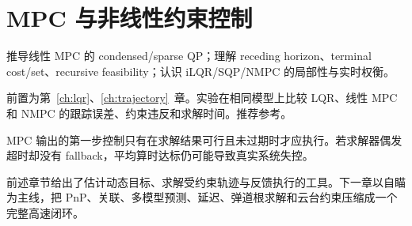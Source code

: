 \chapter{MPC 与非线性约束控制}
\label{ch:mpc}

\begin{learningobjectives}
推导线性 MPC 的 condensed/sparse QP；理解 receding horizon、terminal cost/set、recursive feasibility；认识 iLQR/SQP/NMPC 的局部性与实时权衡。
\end{learningobjectives}

\begin{prerequisites}
前置为第~\ref{ch:lqr}、\ref{ch:trajectory}~章。实验在相同模型上比较 LQR、线性 MPC 和 NMPC 的跟踪误差、约束违反和求解时间。推荐参考\cite{rawlings2017model}。
\end{prerequisites}


\begin{failuremode}
MPC 输出的第一步控制只有在求解结果可行且未过期时才应执行。若求解器偶发超时却没有 fallback，平均算时达标仍可能导致真实系统失控。
\end{failuremode}

\begin{chaptertransition}
前述章节给出了估计动态目标、求解受约束轨迹与反馈执行的工具。下一章以自瞄为主线，把 PnP、关联、多模型预测、延迟、弹道根求解和云台约束压缩成一个完整高速闭环。
\end{chaptertransition}

